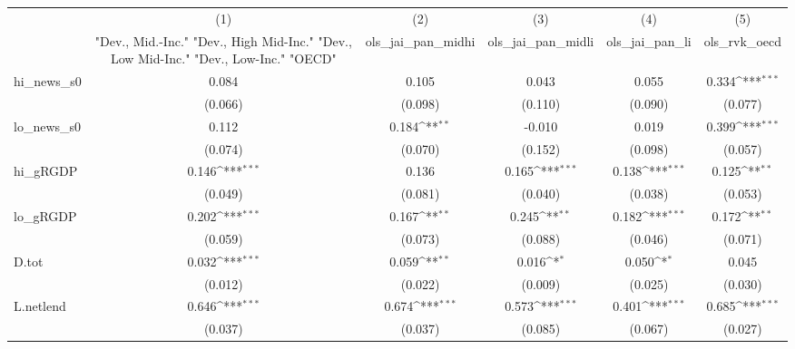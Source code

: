 {
\def\sym#1{\ifmmode^{#1}\else\(^{#1}\)\fi}
\begin{tabular}{l*{5}{c}}
\toprule
            &\multicolumn{1}{c}{(1)}&\multicolumn{1}{c}{(2)}&\multicolumn{1}{c}{(3)}&\multicolumn{1}{c}{(4)}&\multicolumn{1}{c}{(5)}\\
            &\multicolumn{1}{c}{ "Dev., Mid.-Inc." "Dev., High Mid-Inc." "Dev., Low Mid-Inc." "Dev., Low-Inc." "OECD" }&\multicolumn{1}{c}{ols\_jai\_pan\_midhi}&\multicolumn{1}{c}{ols\_jai\_pan\_midli}&\multicolumn{1}{c}{ols\_jai\_pan\_li}&\multicolumn{1}{c}{ols\_rvk\_oecd}\\
\midrule
hi\_news\_s0  &       0.084         &       0.105         &       0.043         &       0.055         &       0.334\sym{***}\\
            &     (0.066)         &     (0.098)         &     (0.110)         &     (0.090)         &     (0.077)         \\
\addlinespace
lo\_news\_s0  &       0.112         &       0.184\sym{**} &      -0.010         &       0.019         &       0.399\sym{***}\\
            &     (0.074)         &     (0.070)         &     (0.152)         &     (0.098)         &     (0.057)         \\
\addlinespace
hi\_gRGDP    &       0.146\sym{***}&       0.136         &       0.165\sym{***}&       0.138\sym{***}&       0.125\sym{**} \\
            &     (0.049)         &     (0.081)         &     (0.040)         &     (0.038)         &     (0.053)         \\
\addlinespace
lo\_gRGDP    &       0.202\sym{***}&       0.167\sym{**} &       0.245\sym{**} &       0.182\sym{***}&       0.172\sym{**} \\
            &     (0.059)         &     (0.073)         &     (0.088)         &     (0.046)         &     (0.071)         \\
\addlinespace
D.tot       &       0.032\sym{***}&       0.059\sym{**} &       0.016\sym{*}  &       0.050\sym{*}  &       0.045         \\
            &     (0.012)         &     (0.022)         &     (0.009)         &     (0.025)         &     (0.030)         \\
\addlinespace
L.netlend   &       0.646\sym{***}&       0.674\sym{***}&       0.573\sym{***}&       0.401\sym{***}&       0.685\sym{***}\\
            &     (0.037)         &     (0.037)         &     (0.085)         &     (0.067)         &     (0.027)         \\

\end{tabular}}

